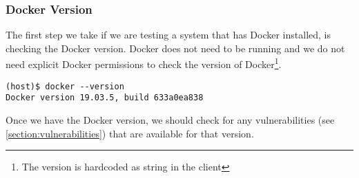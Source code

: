 \subsubsection{Docker Version}
The first step we take if we are testing a system that has Docker installed, is checking the Docker version. Docker does not need to be running and we do not need explicit Docker permissions to check the version of Docker\footnote{The version is hardcoded as string in the client}.

\begin{lstlisting}
(host)$ docker --version
Docker version 19.03.5, build 633a0ea838
\end{lstlisting}

Once we have the Docker version, we should check for any vulnerabilities (see \autoref{section:vulnerabilities}) that are available for that version.
